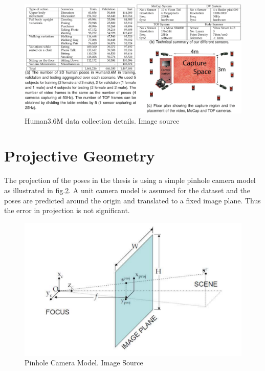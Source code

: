 \begin{figure}[h]
    \centering
    \includegraphics[width=\textwidth]{figures/h36/data_collection.pdf}
    \caption{Human3.6M data collection details. Image source \cite{H3.6}}
    \label{fig:h36_data_collection}
\end{figure}

\section{Projective Geometry}

The projection of the poses in the thesis is using a simple pinhole camera model as illustrated in fig.\ref{fig:pinhole}. A unit camera model is assumed for the dataset and the poses are predicted around the origin and translated to a fixed image plane. Thus the error in projection is not significant. 

\begin{figure}[h]
    \centering
    \includegraphics[scale=0.4]{figures/background/pinhole.png}
    \caption{Pinhole Camera Model. Image Source \cite{pinhole}}
    \label{fig:pinhole}
\end{figure}




